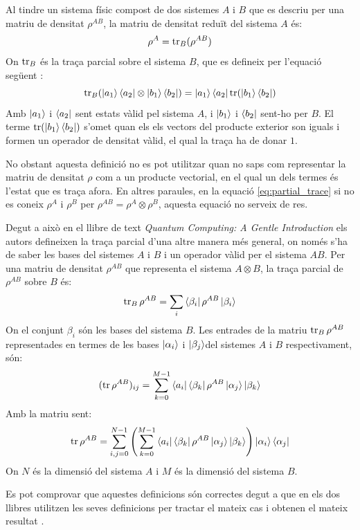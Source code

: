 Al tindre un sistema físic compost de dos sistemes $A$ i $B$ que es descriu per una matriu de densitat $\rho^{AB}$, la matriu de densitat reduït del sistema $A$ és:
\begin{equation}
\rho^A = \tr_B(\rho^{AB})
	\label{eq:partial_trace}
\end{equation}
On $\tr_B$ és la traça parcial sobre el sistema $B$, que es defineix per l'equació següent \cite{QCandQI:partial_trace}: 
\begin{equation*}
	\tr_B(\ket{a_1}\bra{a_2}\otimes\ket{b_1}\bra{b_2}) = \ket{a_1}\bra{a_2}\tr(\ket{b_1}\bra{b_2})
\end{equation*}
Amb $\ket{a_1}$ i $\bra{a_2}$ sent estats vàlid pel sistema $A$, i $\ket{b_1}$ i $\bra{b_2}$ sent-ho per $B$. El terme $\tr(\ket{b_1}\bra{b_2})$ s'omet quan els els vectors del producte exterior son iguals i formen un operador de densitat vàlid, el qual la traça ha de donar $1$.

No obstant aquesta definició no es pot utilitzar quan no saps com representar la matriu de densitat $\rho$ com a un producte vectorial, en el qual un dels termes és l'estat que es traça afora. En altres paraules, en la equació \ref{eq:partial_trace} si no es coneix $\rho^A$ i $\rho^B$ per $\rho^{AB} = \rho^A\otimes\rho^B$, aquesta equació no serveix de res.  

Degut a això en el llibre de text \textit{Quantum Computing: A Gentle Introduction} \cite{QC_intro} els autors defineixen la traça parcial d'una altre manera més general, on només s'ha de saber les bases del sistemes $A$ i $B$ i un operador vàlid per el sistema $AB$. Per una matriu de densitat $\rho^{AB}$ que representa el sistema $A\otimes B$, la traça parcial de $\rho^{AB}$ sobre $B$ és:
$$
\tr_B \rho^{AB} = \sum_i \bra{\beta_i}\rho^{AB}\ket{\beta_i}
$$
On el conjunt ${\beta_i}$ són les bases del sistema $B$. Les entrades de la matriu $\tr_B \rho^{AB}$ representades en termes de les bases ${\ket{\alpha_i}}$ i ${\ket{\beta_j}} $del sistemes $A$ i $B$ respectivament, són:
$$
(\tr\rho^{AB})_{ij} = \sum_{k=0}^{M-1} \bra{a_i}\bra{\beta_k}\rho^{AB}\ket{\alpha_j}\ket{\beta_k}
$$
Amb la matriu sent:
$$
\tr\rho^{AB} = 
\sum_{i,j=0}^{N-1}\left(\sum_{k=0}^{M-1} \bra{a_i}\bra{\beta_k}\rho^{AB}\ket{\alpha_j}\ket{\beta_k}\right) \ket{\alpha_i}\bra{\alpha_j}
$$
On $N$ és la dimensió del sistema $A$ i $M$ és la dimensió del sistema $B$. 

Es pot comprovar que aquestes definicions són correctes degut a que en els dos llibres utilitzen les seves definicions per tractar el mateix cas i obtenen el mateix resultat \cite{QCandQI:example_partial, QC_intro:example_partial}.

